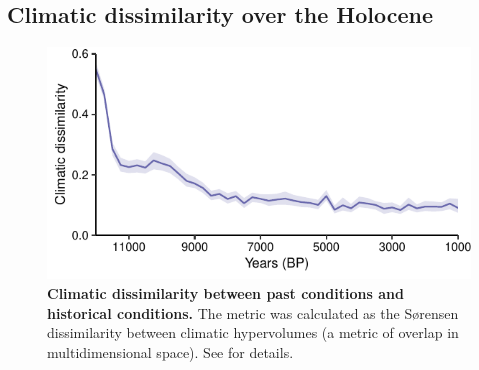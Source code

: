 \clearpage

\subsection{Climatic dissimilarity over the Holocene}

\begin{figure}[htpb]
\centering
\includegraphics{chapter3/figs/figS2-1.pdf}
\caption{\textbf{Climatic dissimilarity between past conditions and historical conditions.} The metric was calculated as the Sørensen dissimilarity between climatic hypervolumes (a metric of overlap in multidimensional space). See \cite{VanderMeersch2024} for details.}
\label{fig:dissimilarity}
\end{figure}